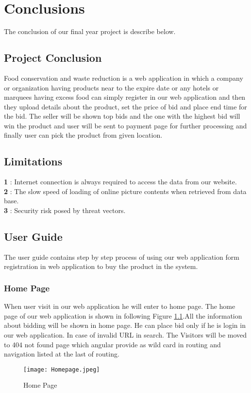 \doublespacing
\chapter{Conclusions}\label{chap:conclusions}
The conclusion of our final year project is describe below.
\section{Project Conclusion}
Food conservation and waste reduction is a web application in which a company or organization having products near to the expire date or any hotels or marquees having excess food can simply register in our web application and then they upload details about the product, set the price of bid and place end time for the bid. The seller will be shown top bids and the one with the highest bid will win the product and user will be sent to payment page for further processing and finally user can pick the product from given location.
\section{Limitations}
\textbf{1} : Internet connection is always required to access the data from our website.\\
\textbf{2} : The slow speed of loading of online picture contents when retrieved from data base.\\
\textbf{3} : Security risk posed by threat vectors.

\section{User Guide}
The user guide contains step by step process of using our web application form registration in web application to buy the product in the system.\\
\subsection{Home Page}
When user visit in our web application he will enter to home page. The home page of our web application is shown in following Figure \ref{HPl}.All the information about bidding will be shown in home page. He can place bid only if he is login in our web application. In case of invalid URL in search. The Visitors  will be moved to 404 not found page which angular provide as wild card in routing and navigation listed at the last of routing.\\
\begin{figure}[h]
    \centering
    \texttt{[image: Homepage.jpeg]}
    \caption{Home Page}
    \label{HPl}
\end{figure}
